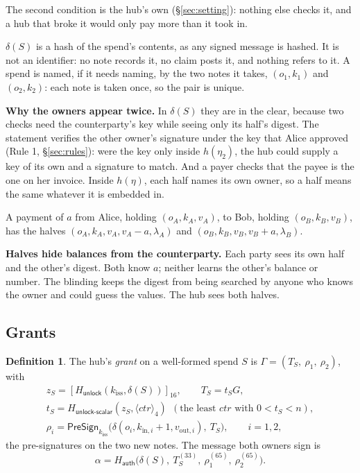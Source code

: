 \documentclass[11pt]{article}
\theoremstyle{plain}
\theoremstyle{definition}
\newtheorem{definition}{Definition}
\newcommand{\be}[2]{\langle #1\rangle_{#2}}
\newcommand{\pre}[2]{[#1]_{#2}}
\newcommand{\Ht}[1]{H_{\textsf{#1}}}
\newcommand{\PSign}{\mathsf{PreSign}}
\newcommand{\kiss}{k_{\mathrm{iss}}}
\begin{document}
The second condition is the hub's own (\S\ref{sec:setting}): nothing
else checks it, and a hub that broke it would only pay more than it took
in.

$\delta(S)$ is a hash of the spend's contents, as any signed message is
hashed. It is not an identifier: no note records it, no claim posts it,
and nothing refers to it. A spend is named, if it needs naming, by the
two notes it takes, $(o_1, k_1)$ and $(o_2, k_2)$: each note is taken
once, so the pair is unique.

\textbf{Why the owners appear twice.} In $\delta(S)$ they are in the
clear, because two checks need the counterparty's key while seeing only
its half's digest. The statement verifies the other owner's signature
under the key that Alice approved (Rule 1, \S\ref{sec:rules}): were the
key only inside $h(\eta_2)$, the hub could supply a key of its own and a
signature to match. And a payer checks that the payee is the one on her
invoice. Inside $h(\eta)$, each half names its own owner, so a half
means the same whatever it is embedded in.

A payment of $a$ from Alice, holding $(o_A, k_A, v_A)$, to Bob, holding
$(o_B, k_B, v_B)$, has the halves $(o_A, k_A, v_A, v_A - a, \lambda_A)$
and $(o_B, k_B, v_B, v_B + a, \lambda_B)$.

\textbf{Halves hide balances from the counterparty.} Each party sees
its own half and the other's digest. Both know $a$; neither learns the
other's balance or number. The blinding keeps the digest from being
searched by anyone who knows the owner and could guess the values. The
hub sees both halves.

\subsection{Grants}\label{sec:grant}

\begin{definition}
The hub's \emph{grant} on a well-formed spend $S$ is $\Gamma = (T_S,\
\rho_1,\ \rho_2)$, with
\begin{gather*}
  z_S = \pre{\Ht{unlock}(\kiss, \delta(S))}{16},\qquad T_S = t_S G,\\
  t_S = \Ht{unlock-scalar}(z_S, \be{\mathit{ctr}}{4})\ \ (\text{the least
  } \mathit{ctr} \text{ with } 0 < t_S < n),\\
  \rho_i = \PSign_{\kiss}\big(\delta(o_i, k_{\mathrm{in},i} + 1,
  v_{\mathrm{out},i}),\ T_S\big),\qquad i = 1, 2,
\end{gather*}
the pre-signatures on the two new notes. The message both owners sign is
\[
  \alpha = \Ht{auth}\big(\delta(S),\ T_S^{(33)},\ \rho_1^{(65)},\
  \rho_2^{(65)}\big).
\]
\end{definition}
\end{document}
